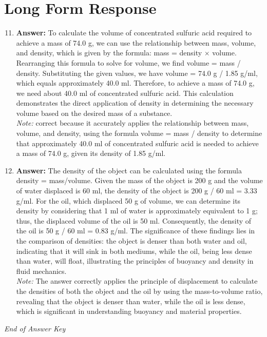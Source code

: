 \documentclass[12pt]{article}
\begin{document}
\section*{Long Form Response}
\begin{enumerate}[label=\arabic*.]
\setcounter{enumi}{10}
\item \textbf{Answer:} To calculate the volume of concentrated sulfuric acid required to achieve a mass of 74.0 g, we can use the relationship between mass, volume, and density, which is given by the formula: mass = density \ensuremath{\times} volume. Rearranging this formula to solve for volume, we find volume = mass / density. Substituting the given values, we have volume = 74.0 g / 1.85 g/ml, which equals approximately 40.0 ml. Therefore, to achieve a mass of 74.0 g, we need about 40.0 ml of concentrated sulfuric acid. This calculation demonstrates the direct application of density in determining the necessary volume based on the desired mass of a substance.
\\ \textit{Note:} correct because it accurately applies the relationship between mass, volume, and density, using the formula volume = mass / density to determine that approximately 40.0 ml of concentrated sulfuric acid is needed to achieve a mass of 74.0 g, given its density of 1.85 g/ml.
\item \textbf{Answer:} The density of the object can be calculated using the formula density = mass/volume. Given the mass of the object is 200 g and the volume of water displaced is 60 ml, the density of the object is 200 g / 60 ml = 3.33 g/ml. For the oil, which displaced 50 g of volume, we can determine its density by considering that 1 ml of water is approximately equivalent to 1 g; thus, the displaced volume of the oil is 50 ml. Consequently, the density of the oil is 50 g / 60 ml = 0.83 g/ml. The significance of these findings lies in the comparison of densities: the object is denser than both water and oil, indicating that it will sink in both mediums, while the oil, being less dense than water, will float, illustrating the principles of buoyancy and density in fluid mechanics.
\\ \textit{Note:} The answer correctly applies the principle of displacement to calculate the densities of both the object and the oil by using the mass-to-volume ratio, revealing that the object is denser than water, while the oil is less dense, which is significant in understanding buoyancy and material properties.
\end{enumerate}

\vfill
\noindent\textit{End of Answer Key}
\end{document}
